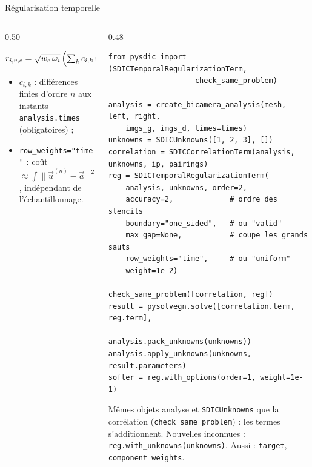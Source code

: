 \documentclass[aspectratio=169,11pt]{beamer}
\newcommand{\cls}[1]{\textcolor{pyblue}{\texttt{#1}}}
\begin{document}
\begin{frame}[fragile]{Régularisation temporelle}
  \begin{columns}[T]
    \begin{column}{0.50\textwidth}\scriptsize
      \centering
 
      \raggedright\vspace{-2pt}
      \[
        r_{i,v,e} = \sqrt{w_e\,\omega_i}\,\Bigl(\textstyle\sum_k c_{i,k}\, u_{f_k,v,e}
        - a_{f_i,v,e}\Bigr)
      \]
      \begin{itemize}\setlength{\itemsep}{0pt}
        \item $c_{i,k}$ : différences finies d'ordre $n$ aux \alert{instants}
              \texttt{analysis.times} (obligatoires) ;
        \item \texttt{row\_weights="time"} : coût $\approx \int \|\vec{u}^{(n)} - \vec{a}\|^2\,dt$,
              indépendant de l'échantillonnage.
      \end{itemize}
    \end{column}
    \begin{column}{0.48\textwidth}
\begin{lstlisting}[basicstyle=\ttfamily\tiny]
from pysdic import (SDICTemporalRegularizationTerm,
                    check_same_problem)
 
analysis = create_bicamera_analysis(mesh, left, right,
    imgs_g, imgs_d, times=times)
unknowns = SDICUnknowns([1, 2, 3], [])
correlation = SDICCorrelationTerm(analysis, unknowns, ip, pairings)
reg = SDICTemporalRegularizationTerm(
    analysis, unknowns, order=2,
    accuracy=2,             # ordre des stencils
    boundary="one_sided",   # ou "valid"
    max_gap=None,           # coupe les grands sauts
    row_weights="time",     # ou "uniform"
    weight=1e-2)
 
check_same_problem([correlation, reg])
result = pysolvegn.solve([correlation.term, reg.term],
                         analysis.pack_unknowns(unknowns))
analysis.apply_unknowns(unknowns, result.parameters)
softer = reg.with_options(order=1, weight=1e-1)
\end{lstlisting}
      \tiny \alert{Mêmes objets} analyse et \cls{SDICUnknowns} que la corrélation
      (\texttt{check\_same\_problem}) : les termes s'additionnent. Nouvelles inconnues : \texttt{reg.with\_unknowns(unknowns)}.
      Aussi : \texttt{target}, \texttt{component\_weights}.
    \end{column}
  \end{columns}
\end{frame}
\end{document}
